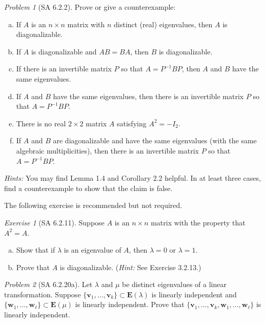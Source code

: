 \documentclass[fleqn,11pt]{paper}
\theoremstyle{remark}
\newtheorem{problem}{Problem}
\newtheorem*{solution}{{\bf Solution}}
\newtheorem*{ex}{Exercise}
\renewcommand{\vec}[1]{\mathbf{#1}}
\newcommand{\<}{\ensuremath{\langle}}
\renewcommand{\>}{\ensuremath{\rangle}}
\newcommand\vv{\vec{v}}
\newcommand\vw{\vec{w}}
\begin{document}
\begin{problem}[SA 6.2.2]
Prove or give a counterexample:
\begin{enumerate}[a.]
\item If $A$ is an $n \times n$ matrix with $n$ distinct (real) eigenvalues,
  then $A$ is diagonalizable.
\item If $A$ is diagonalizable and $AB = BA$, then $B$ is diagonalizable.
\item If there is an invertible matrix $P$ so that $A = P^{-1}BP$, then $A$ and
  $B$ have the same eigenvalues.
\item If $A$ and $B$ have the same eigenvalues, then there is an invertible matrix $P$ so that
$A = P^{-1}BP$.
\item There is no real $2 \times 2$ matrix $A$ satisfying $A^2 = -I_2$.
\item If $A$ and $B$ are diagonalizable and have the same eigenvalues (with the same algebraic
multiplicities), then there is an invertible matrix $P$ so that $A = P^{-1}BP$.
\end{enumerate}
{\it Hints:} You may find Lemma 1.4 and Corollary 2.2 helpful. 
In at least three cases, find a counterexample to show that the claim is false.
\end{problem}
\newpage

\noindent The following exercise is recommended but not required.
\begin{ex}[SA 6.2.11]
Suppose $A$ is an $n \times n$ matrix with the property that $A^2 = A$.
\begin{enumerate}[a.]
\item Show that if $\lambda$ is an eigenvalue of $A$, then $\lambda = 0$ or $\lambda = 1$.
\item Prove that $A$ is diagonalizable. ({\it Hint:} See Exercise 3.2.13.)
\end{enumerate}
\end{ex}
\newpage

\begin{problem}[SA 6.2.20a]
Let $\lambda$ and $\mu$ be distinct eigenvalues of a linear
transformation. Suppose 
$\{\vv_1,\dots, \vv_k\} \subset \mathbf{E}(\lambda)$
is linearly independent and 
$\{\vw_1,\dots, \vw_\ell\} \subset \mathbf{E}(\mu)$
is linearly independent.
Prove that $\{\vv_1,\dots, \vv_k, \vw_1,\dots, \vw_\ell\}$ is linearly
independent.
\end{problem}
\newpage
\end{document}
